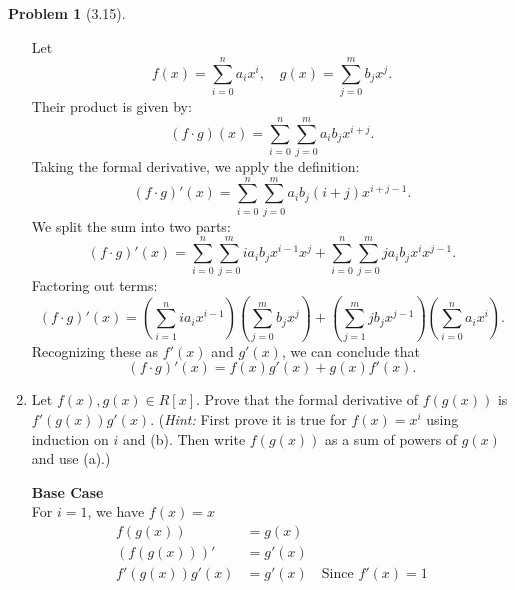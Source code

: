 \documentclass[12pt]{article}
\theoremstyle{definition}
\newtheorem{problem}{Problem}
\begin{document}
\begin{problem}[3.15]
\begin{enumerate}[label=(\alph*)]
        \begin{solution}
            Let 
            \[
            f(x) = \sum_{i=0}^{n} a_i x^i, \quad g(x) = \sum_{j=0}^{m} b_j x^j.
            \]
            Their product is given by:
            \[
            (f \cdot g)(x) = \sum_{i=0}^{n} \sum_{j=0}^{m} a_i b_j x^{i+j}.
            \]
            Taking the formal derivative, we apply the definition:
            \[
            (f \cdot g)'(x) = \sum_{i=0}^{n} \sum_{j=0}^{m} a_i b_j (i + j) x^{i+j-1}.
            \]
            We split the sum into two parts:
            \[
            (f \cdot g)'(x) = \sum_{i=0}^{n} \sum_{j=0}^{m} i a_i b_j x^{i-1} x^j + \sum_{i=0}^{n} \sum_{j=0}^{m} j a_i b_j x^i x^{j-1}.
            \]
            Factoring out terms:
            \[
            (f \cdot g)'(x) = \left( \sum_{i=1}^{n} i a_i x^{i-1} \right) \left( \sum_{j=0}^{m} b_j x^j \right) + \left( \sum_{j=1}^{m} j b_j x^{j-1} \right) \left( \sum_{i=0}^{n} a_i x^i \right).
            \]
            Recognizing these as $f'(x)$ and $g'(x)$, we can conclude that
            \[
            (f \cdot g)'(x) = f(x) g'(x) + g(x) f'(x).
            \]
        \end{solution}
        \item Let $f(x), g(x) \in R[x]$. Prove that the formal derivative of $f(g(x))$ is $f'(g(x))g'(x)$. 
        (\textit{Hint:} First prove it is true for $f(x) = x^i$ using induction on $i$ and (b). Then write $f(g(x))$
        as a sum of powers of $g(x)$ and use (a).)
        
        \begin{solution}
            \textbf{Base Case}\\
            For $i=1$, we have $f(x) = x$
            \begin{align*}
                f(g(x)) &= g(x)\\
                (f(g(x)))' &= g'(x)\\
                f'(g(x)) g'(x) &= g'(x) \quad \text{Since $f'(x) = 1$}
            \end{align*}


\end{solution}
\end{enumerate}
\end{problem}
\end{document}
